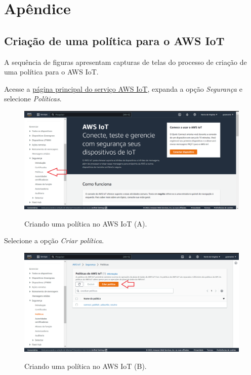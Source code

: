 \chapter{Apêndice}\label{chapter:apendice}

\section{Criação de uma política para o AWS IoT}\label{section:criacao_de_uma_politica_para_o_aws_iot}

A sequência de figuras apresentam capturas de telas do processo de criação de uma política para o AWS IoT.

Acesse a \href{https://us-east-1.console.aws.amazon.com/iot/home?region=us-east-1#/home}{página principal do serviço AWS IoT}, expanda a opção \textit{Segurança} e selecione \textit{Políticas}.

\begin{figure}[H]
    \centering
    \caption{Criando uma política no AWS IoT (A).}
    \includegraphics[scale=0.472]{Imagens/criando_uma_politica_no_aws_iot_0.png}
    \label{fig:criando_uma_politica_no_aws_iot_a}
\end{figure}

Selecione a opção \textit{Criar política}.

\begin{figure}[H]
    \centering
    \caption{Criando uma política no AWS IoT (B).}
    \includegraphics[scale=0.472]{Imagens/criando_uma_politica_no_aws_iot_1.png}
    \label{fig:criando_uma_politica_no_aws_iot_b}
\end{figure}

